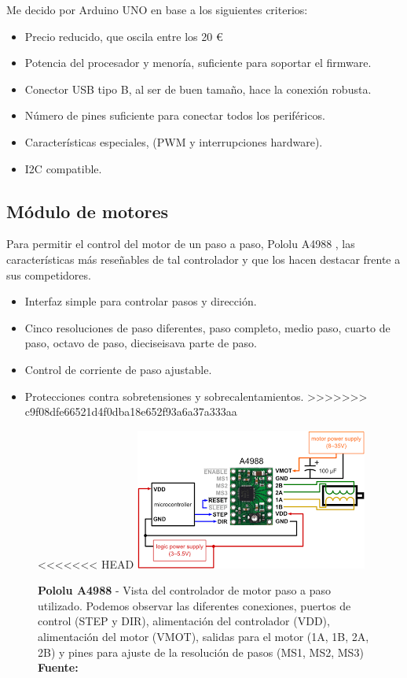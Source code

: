 \newpage

Me decido por Arduino UNO en base a los siguientes criterios:

\begin{itemize}
	\item{Precio reducido}, que oscila entre los 20 \euro
	\item{Potencia del procesador y menoría}, suficiente para soportar el firmware.
	\item{Conector USB tipo B}, al ser de buen tamaño, hace la conexión robusta.
	\item{Número de pines} suficiente para conectar todos los periféricos.
	\item{Características especiales}, (PWM y interrupciones hardware). 
	\item{I2C} compatible. 
\end{itemize}


\subsection{Módulo de motores}

Para permitir el control del motor de un paso a paso,  Pololu A4988 \cite{pololu},
las características más reseñables de tal controlador y que los hacen destacar frente a sus competidores.

\begin{itemize}
	\item{} Interfaz simple para controlar pasos y dirección.
	\item{} Cinco resoluciones de paso diferentes, paso completo, medio paso, cuarto de paso, octavo de paso, dieciseisava parte de paso. 
	\item{} Control de corriente de paso ajustable.
	\item{} Protecciones contra sobretensiones y sobrecalentamientos.
>>>>>>> c9f08dfe66521d4f0dba18e652f93a6a37a333aa
\end{itemize}


\begin{figure}[h]
<<<<<<< HEAD
	\centering
	\includegraphics[width=0.8\linewidth]{../images/pinout_pololu}
	\caption[Diagrama Pololu A4988]{\textbf{Pololu A4988} - Vista del controlador de motor paso a paso utilizado. Podemos observar las diferentes conexiones, puertos de control (STEP y DIR), alimentación del controlador (VDD), alimentación del motor (VMOT), salidas para el motor (1A, 1B, 2A, 2B) y pines para ajuste de la resolución de pasos (MS1, MS2, MS3) \textbf{Fuente:} \cite{pololu} }
	\label{fig:pololu}
\end{figure}

